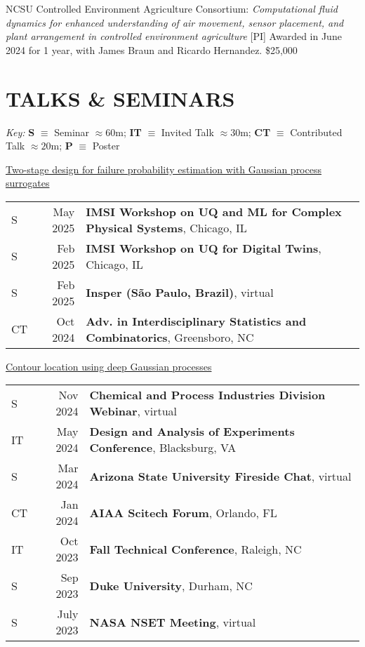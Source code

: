 \documentclass[margin,line,11pt]{res}
\begin{document}
\begin{resume}
NCSU Controlled Environment Agriculture Consortium: {\it Computational fluid dynamics for
enhanced understanding of air movement, sensor placement, and plant arrangement in controlled
environment agriculture} [PI] Awarded in June 2024 for 1 year, with James Braun and 
Ricardo Hernandez. \hfill \$25,000

\medskip
\section{\bf TALKS \& SEMINARS}
{\em Key:}
{\bf S} $\equiv$ Seminar $\approx60$m;
{\bf IT} $\equiv$ Invited Talk $\approx30$m;
{\bf CT} $\equiv$ Contributed Talk $\approx20$m; 
{\bf P} $\equiv$ Poster %

\underline{Two-stage design for failure probability estimation with Gaussian process surrogates}\\
\begin{tabular}{lrl}
S\quad\quad & May 2025 & {\bf IMSI Workshop on UQ and ML for Complex Physical Systems}, Chicago, IL \\
S\quad\quad & Feb 2025 & {\bf IMSI Workshop on UQ for Digital Twins}, Chicago, IL \\
S\quad\quad & Feb 2025 & {\bf Insper (S\~ao Paulo, Brazil)}, virtual \\
CT\quad\quad & Oct 2024 & {\bf Adv. in Interdisciplinary Statistics and Combinatorics}, Greensboro, NC \\
\end{tabular}

\underline{Contour location using deep Gaussian processes}\\
\begin{tabular}{lrl}
S\quad\quad & Nov 2024 & {\bf Chemical and Process Industries Division Webinar}, virtual \\
IT\quad\quad & May 2024 & {\bf Design and Analysis of Experiments Conference}, Blacksburg, VA \\
S\quad\quad & Mar 2024 & {\bf Arizona State University Fireside Chat}, virtual \\
CT\quad\quad & Jan 2024 & {\bf AIAA Scitech Forum}, Orlando, FL \\
IT\quad\quad & Oct 2023 & {\bf Fall Technical Conference}, Raleigh, NC \\
S\quad\quad & Sep 2023 & {\bf Duke University}, Durham, NC \\ 
S\quad\quad & July 2023 & {\bf NASA NSET Meeting}, virtual \\
\end{tabular}


\end{resume}
\end{document}
